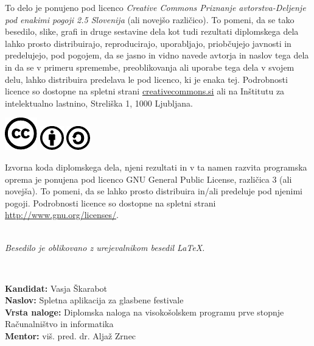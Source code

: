 \documentclass[a4paper,12pt,openright]{book}
\newcommand{\clearemptydoublepage}{\newpage{\pagestyle{empty}\cleardoublepage}}
\newcommand{\CcImageCc}[1]{%
	\includegraphics[scale=#1]{cc_cc_30.pdf}%
}
\newcommand{\CcImageBy}[1]{%
	\includegraphics[scale=#1]{cc_by_30.pdf}%
}
\newcommand{\CcImageSa}[1]{%
	\includegraphics[scale=#1]{cc_sa_30.pdf}%
}
\begin{document}
\newpage
\thispagestyle{empty}

\vspace*{5cm}
{\small \noindent
To delo je ponujeno pod licenco \textit{Creative Commons Priznanje avtorstva-Deljenje pod enakimi pogoji 2.5 Slovenija} (ali novej\v so razli\v cico).
To pomeni, da se tako besedilo, slike, grafi in druge sestavine dela kot tudi rezultati diplomskega dela lahko prosto distribuirajo,
reproducirajo, uporabljajo, priobčujejo javnosti in predelujejo, pod pogojem, da se jasno in vidno navede avtorja in naslov tega
dela in da se v primeru spremembe, preoblikovanja ali uporabe tega dela v svojem delu, lahko distribuira predelava le pod
licenco, ki je enaka tej.
Podrobnosti licence so dostopne na spletni strani \href{http://creativecommons.si}{creativecommons.si} ali na Inštitutu za
intelektualno lastnino, Streliška 1, 1000 Ljubljana.

\vspace*{1cm}
\begin{center}%
\CcImageCc{0.741573033707865}\hspace*{1ex}\CcImageBy{1}\hspace*{1ex}\CcImageSa{1}%
\end{center}
}

\vspace*{1cm}
{\small \noindent
Izvorna koda diplomskega dela, njeni rezultati in v ta namen razvita programska oprema je ponujena pod licenco GNU General Public License,
različica 3 (ali novejša). To pomeni, da se lahko prosto distribuira in/ali predeluje pod njenimi pogoji.
Podrobnosti licence so dostopne na spletni strani \url{http://www.gnu.org/licenses/}.
}

\vfill
\begin{center} 
\ \\ \vfill
{\em
Besedilo je oblikovano z urejevalnikom besedil \LaTeX.}
\end{center}

\clearemptydoublepage

\thispagestyle{empty}
\
\vfill

\bigskip
\noindent\textbf{Kandidat:} Vasja Škarabot \\
\noindent\textbf{Naslov:} Spletna aplikacija za glasbene festivale\\
\noindent\textbf{Vrsta naloge:} Diplomska naloga na visokošolskem programu prve stopnje Računalništvo in informatika \\
\noindent\textbf{Mentor:} viš. pred. dr. Aljaž Zrnec\\
\end{document}
